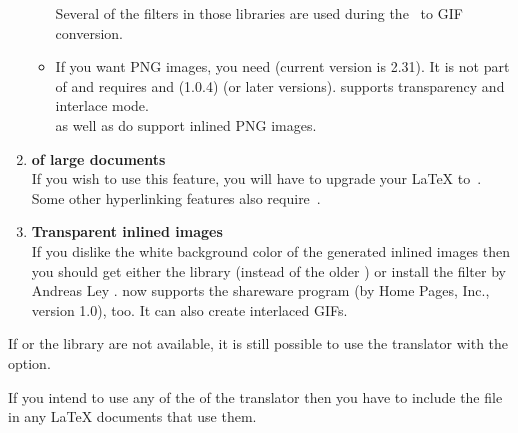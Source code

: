\begin{enumerate}
\begin{itemize}
Several of the filters in those libraries are used during the \PS\ to
GIF conversion. 
%
%
\item 
If you want PNG images, you need  (current version is 2.31).
It is not part of  and requires  and
 (1.0.4) (or later versions).
 supports transparency and interlace mode.\\
 as well as  do support inlined
PNG images.
\end{itemize}


%
%
\item 
\textbf{ of large documents}\\
If you wish to use this feature, you will have to upgrade your
\LaTeX{} to \LaTeXe\,. 
Some other hyperlinking features also require \LaTeXe\,.

%
%
\item 
\textbf{Transparent inlined images}\\
If you dislike the white background color of the
generated inlined images then you should get either 
the  library (instead of the older ) 
or install the 
filter by Andreas Ley . 
\latextohtml{} now supports the shareware program 
(by Home Pages, Inc., version 1.0), too.
It can also create interlaced GIFs.
%
\end{enumerate} 

%

\noindent
If  or the  library are
not available, it is still possible to use the translator with the
 option. 

%
%
\html{\\}%

If you intend to use any of the 
of the translator 
then you have to include the  file 
in any \LaTeX{}  documents that use them. 

